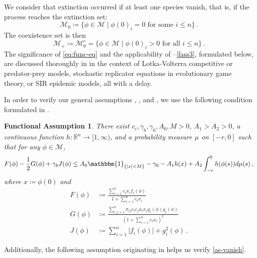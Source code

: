 \documentclass[final]{amsart}
\newtheorem{fass}{Functional Assumption}[]
\numberwithin{thm}{section}
\numberwithin{equation}{section}
\newcommand{\mcM}{\mathcal{M}}
\newcommand{\R}{\mathbb{R}}
\newcommand{\Id}{\mathbbm{1}}
\newcommand{\inv}{\mathcal{M}_+}
\begin{document}
We consider that extinction occurred if 
 at least one species vanish, that is, if the process reaches the extinction set:
$$\mcM_0 \coloneqq \{\phi \in \mcM \mid \phi(0)_i = 0 \text{ for some } i \leq n\} \,.$$ 
The coexistence set is then
$$\inv \coloneqq \mcM_0^c = \{\phi \in \mcM \mid \phi(0)_i > 0 \text{ for all } i \leq n\} \,.
$$
The significance of \eqref{eq:func-eq} and the applicability of 
--\ref{fass3}, formulated below, are discussed thoroughly in \cite{functional} in the context of Lotka-Volterra competitive or predator-prey models, stochastic replicator equations in evolutionary game theory, or SIR epidemic models, all with a delay.

In order to verify our general assumptions , , and , we use the following condition formulated in \cite[Assumption 2.1 (3)]{functional}.

\begin{fass}\label{fass1}
There exist $c_i, \gamma_b, \gamma_0, A_0, M > 0$, $A_1 > A_2 > 0$, a continuous function $h: \R^n \to [1,\infty)$, and a probability measure $\mu$ on $[-r,0]$ such that for any $\phi \in \mcM$, \begin{equation*}
    F(\phi) - \frac{1}{2}G(\phi) + \gamma_b J(\phi) \leq A_0\Id_{\{|x| < M\}} - \gamma_0 - A_1h(x) + A_2 \int_{-r}^0 h(\phi(s))d\mu(s) \,,
\end{equation*}
where $x \coloneqq \phi(0)$ and
\begin{align*}
    F(\phi) &\coloneqq \frac{\sum_{i=1}^nc_ix_if_i(\phi)}{1 + \sum_{i=1}^nc_ix_i} \\
    G(\phi) &\coloneqq \frac{\sum_{i,j = 1}^n \sigma_{ij}c_ic_jx_ix_jg_i(\phi)g_j(\phi)}{(1 + \sum_{i=1}^nc_ix_i)^2} \\
    J(\phi) &\coloneqq \sum_{i=1}^n |f_i(\phi)| + g_i^2(\phi) \,.
\end{align*}
\end{fass}

Additionally, the following assumption originating in \cite[Assumption 2.2]{functional} helps us verify  \ref{as-vanish}. 
\end{document}
